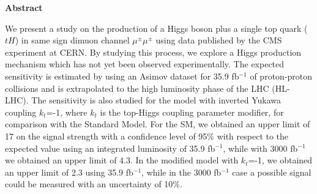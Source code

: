 \thispagestyle{empty}
\vspace*{2.2cm}
\begin{center}
	\Large \textbf{Abstract}
\end{center} 
\vspace{1.5cm}



We present a study on the production of a Higgs boson plus a single top quark ($tH$) in same sign dimuon channel $\mu^\pm \mu^\pm$ using data published by the CMS experiment at CERN. By studying this
process, we explore a Higgs production mechanism which has not yet been observed
experimentally. The expected sensitivity is estimated by using an Asimov dataset for 35.9 fb$^{-1}$ of proton-proton collisions and is extrapolated to the high luminosity phase of the LHC (HL-LHC).
The sensitivity is also studied for the model with inverted Yukawa coupling $k_t$=-1, where $k_t$ is the top-Higgs coupling parameter modifier, for comparison with the Standard Model. For the SM, we obtained an upper limit of 17 on the signal strength with a confidence level of 95$\%$ with respect to the expected value using an integrated luminosity of 35.9 fb$^{-1}$, while with 3000 fb$^{-1}$ we obtained an upper limit of 4.3. In the modified model with $k_t$=-1, we obtained an upper limit of 2.3 using 35.9 fb$^{-1}$, while in the 3000 fb$^{-1}$ case a possible signal could be measured with an uncertainty of 10$\%$. 

